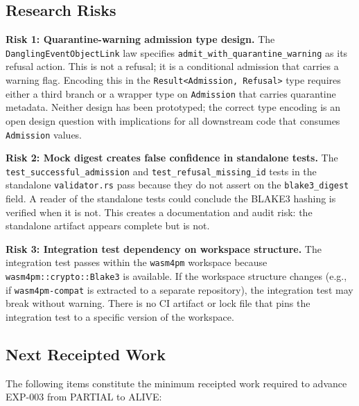 \subsection{Research Risks}
\label{sec:otel-weaver-exp-003-live-check-to-refusal-open-risks}

\textbf{Risk 1: Quarantine-warning admission type design.}
The \texttt{DanglingEventObjectLink} law specifies \texttt{admit\_with\_quarantine\_warning}
as its refusal action. This is not a refusal; it is a conditional admission that
carries a warning flag. Encoding this in the \texttt{Result<Admission, Refusal>}
type requires either a third branch or a wrapper type on \texttt{Admission} that
carries quarantine metadata. Neither design has been prototyped; the correct type
encoding is an open design question with implications for all downstream code that
consumes \texttt{Admission} values.

\textbf{Risk 2: Mock digest creates false confidence in standalone tests.}
The \texttt{test\_successful\_admission} and \texttt{test\_refusal\_missing\_id}
tests in the standalone \texttt{validator.rs} pass because they do not assert on
the \texttt{blake3\_digest} field. A reader of the standalone tests could conclude
the BLAKE3 hashing is verified when it is not. This creates a documentation and
audit risk: the standalone artifact appears complete but is not.

\textbf{Risk 3: Integration test dependency on workspace structure.}
The integration test passes within the \texttt{wasm4pm} workspace because
\texttt{wasm4pm::crypto::Blake3} is available. If the workspace structure changes
(e.g., if \texttt{wasm4pm-compat} is extracted to a separate repository), the
integration test may break without warning. There is no CI artifact or lock file
that pins the integration test to a specific version of the workspace.

\subsection{Next Receipted Work}
\label{sec:otel-weaver-exp-003-live-check-to-refusal-open-next}

The following items constitute the minimum receipted work required to advance
EXP-003 from PARTIAL to ALIVE:

